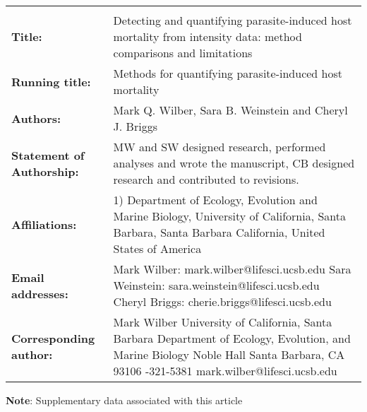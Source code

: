 \documentclass[12pt, a4paper]{article}
\begin{document}
\setlength{\parindent}{0in}
\renewcommand{\arraystretch}{2}
\begin{tabular}{p{3cm} p{10cm}}

\large\textbf{} & \vspace\baselineskip \\

\textbf{Title:} & Detecting and quantifying parasite-induced host mortality from intensity data: method comparisons and limitations \\

\textbf{Running title:} & Methods for quantifying parasite-induced host mortality  \\

\textbf{Authors:} & Mark Q. Wilber, Sara B. Weinstein and Cheryl J. Briggs \\

\textbf{Statement of Authorship:} & MW and SW designed research, performed
analyses and wrote the manuscript, CB designed research and contributed to revisions. \\

\textbf{Affiliations:} &
1) Department of Ecology, Evolution and Marine Biology, University of California,
Santa Barbara, Santa Barbara California, United States of America \\

\textbf{Email addresses:} &
Mark Wilber: mark.wilber@lifesci.ucsb.edu \newline
Sara Weinstein: sara.weinstein@lifesci.ucsb.edu \newline
Cheryl Briggs: cherie.briggs@lifesci.ucsb.edu \\

\textbf{Corresponding \newline author:} &
Mark Wilber \newline
University of California, Santa Barbara \newline
Department of Ecology, Evolution, and Marine Biology \newline
2111 Noble Hall \newline
Santa Barbara, CA 93106 \newline
505-321-5381 \newline
mark.wilber@lifesci.ucsb.edu \newline


\end{tabular}

\textbf{Note}: Supplementary data associated with this article
\end{document}
